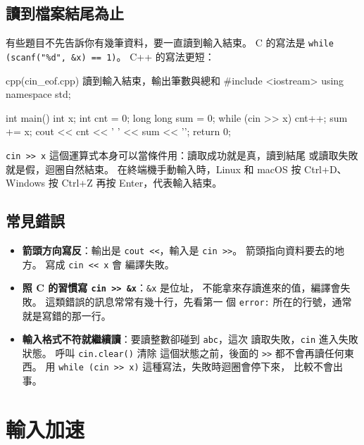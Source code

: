 \subsection{讀到檔案結尾為止}

有些題目不先告訴你有幾筆資料，要一直讀到輸入結束。 C 的寫法是
\texttt{while (scanf("\%d", \&x) == 1)}。 C++ 的寫法更短：

\begin{example}[label=ex:cin-eof]{cpp}{(cin\_eof.cpp) 讀到輸入結束，輸出筆數與總和}
#include <iostream>
using namespace std;

int main() {
    int x;
    int cnt = 0;
    long long sum = 0;
    while (cin >> x) {
        cnt++;
        sum += x;
    }
    cout << cnt << ' ' << sum << '\n';
    return 0;
}
\end{example}


\texttt{cin >> x} 這個運算式本身可以當條件用：讀取成功就是真，讀到結尾
或讀取失敗就是假，迴圈自然結束。 在終端機手動輸入時，Linux 和 macOS
按 Ctrl+D、Windows 按 Ctrl+Z 再按 Enter，代表輸入結束。

\subsection{常見錯誤}

\begin{itemize}
\item \textbf{箭頭方向寫反}：輸出是 \texttt{cout <<}，輸入是
\texttt{cin >>}。 箭頭指向資料要去的地方。 寫成 \texttt{cin << x} 會
編譯失敗。
\item \textbf{照 C 的習慣寫 \texttt{cin >> \&x}}：\texttt{\&x} 是位址，
不能拿來存讀進來的值，編譯會失敗。 這類錯誤的訊息常常有幾十行，先看第一
個 \texttt{error:} 所在的行號，通常就是寫錯的那一行。
\item \textbf{輸入格式不符就繼續讀}：要讀整數卻碰到 \texttt{abc}，這次
讀取失敗，\texttt{cin} 進入失敗狀態。 呼叫 \texttt{cin.clear()} 清除
這個狀態之前，後面的 \texttt{>>} 都不會再讀任何東西。 用 \texttt{while (cin >> x)} 這種寫法，失敗時迴圈會停下來，
比較不會出事。
\end{itemize}

\section{輸入加速}
\label{sec:fast-io}

